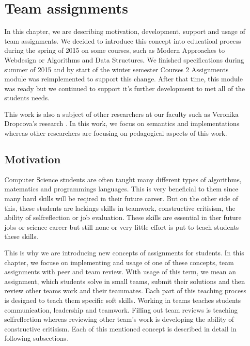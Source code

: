 \chapter{Team assignments}

In this chapter, we are describing motivation, development, support and usage of team assignments. We decided to introduce this concept into educatioal process during the spring of 2015 on some courses, such as Modern Approaches to Webdesign or Algorithms and Data Structures. We finished specifications during summer of 2015 and by start of the winter semester   Courses 2 Assignments module was reimplemented to support this change. After that time, this module was ready but we continued to support it's further development to met all of the students needs.

This work is also a subject of other researchers at our faculty such as Veronika Dropcova's research \cite{dropcova}. In this work, we focus on semantics and implementations whereas other researchers are focusing on pedagogical aspects of this work.


\section{Motivation}

Computer Science students are often taught many different types of algorithms, matematics and programmings languages. This is very beneficial to them since many hard skills will be reqired in their future career. But on the other side of this, these students are lackings skills in teamwork, constructive critisism, the ability of self\-reflection or job evaluation.  These skills are essential in ther future jobs or science career but still none or very little effort is put to teach students these skills. 

This is why we are introducing new concepts of assignments for students.  In this chapter, we focuse on implementing and usage of one of these concepts, team assignments with peer and team review. With usage of this term, we mean an assignment, which students solve in small teams, submit their solutions and then review other teams work and their teammates. Each part of this teaching process is designed to teach them specific soft skills. Working in teams teaches students communication, leadership and teamwork. Filling out team reviews is teaching self\-reflection whereas reviewing other team's work is developing the ability of constructive critisism. Each of this mentioned concept is described in detail in following subsections.


